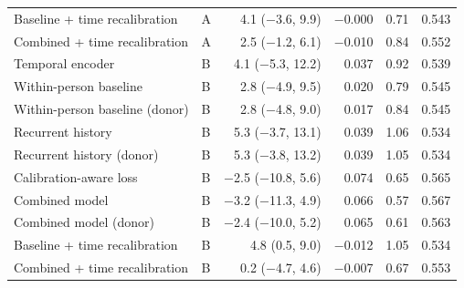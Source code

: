 {\begin{table}[h]
\begin{tabular}{@{}llrrrr@{}}
Baseline + time recalibration & A & 4.1 ($-$3.6, 9.9) & $-$0.000 & 0.71 & 0.543 \\
Combined + time recalibration & A & 2.5 ($-$1.2, 6.1) & $-$0.010 & 0.84 & 0.552 \\
\addlinespace[2pt]
Temporal encoder & B & 4.1 ($-$5.3, 12.2) & 0.037 & 0.92 & 0.539 \\
Within-person baseline & B & 2.8 ($-$4.9, 9.5) & 0.020 & 0.79 & 0.545 \\
Within-person baseline (donor) & B & 2.8 ($-$4.8, 9.0) & 0.017 & 0.84 & 0.545 \\
Recurrent history & B & 5.3 ($-$3.7, 13.1) & 0.039 & 1.06 & 0.534 \\
Recurrent history (donor) & B & 5.3 ($-$3.8, 13.2) & 0.039 & 1.05 & 0.534 \\
Calibration-aware loss & B & $-$2.5 ($-$10.8, 5.6) & 0.074 & 0.65 & 0.565 \\
Combined model & B & $-$3.2 ($-$11.3, 4.9) & 0.066 & 0.57 & 0.567 \\
Combined model (donor) & B & $-$2.4 ($-$10.0, 5.2) & 0.065 & 0.61 & 0.563 \\
Baseline + time recalibration & B & 4.8 (0.5, 9.0) & $-$0.012 & 1.05 & 0.534 \\
Combined + time recalibration & B & 0.2 ($-$4.7, 4.6) & $-$0.007 & 0.67 & 0.553 \\
\bottomrule
\end{tabular}
\end{table}}
